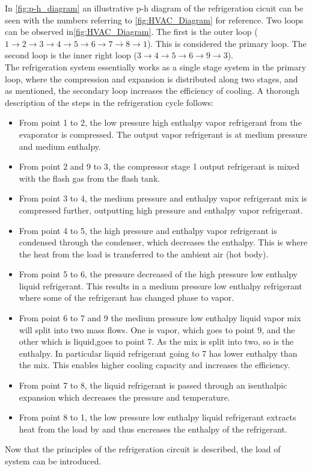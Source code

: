 In \cref{fig:p-h_diagram} an illustrative p-h diagram of the refrigeration cicuit can be seen with the numbers referring to \cref{fig:HVAC_Diagram} for reference. Two loops can be observed in\cref{fig:HVAC_Diagram}. The first is the outer loop ($1 \rightarrow 2\rightarrow 3 \rightarrow 4 \rightarrow 5 \rightarrow 6 \rightarrow 7 \rightarrow 8 \rightarrow 1$). This is considered the primary loop. The second loop is the inner right loop ($3 \rightarrow 4 \rightarrow 5 \rightarrow 6 \rightarrow 9 \rightarrow 3$). \\
The refrigeration system essentially works as a single stage system in the primary loop, where the compression and expansion is distributed along two stages, and as mentioned, the secondary loop  increases the efficiency of cooling. A thorough description of the steps in the refrigeration cycle follows:
\begin{itemize}
	\item From point 1 to 2, the low pressure high enthalpy vapor refrigerant from the evaporator is compressed. The output vapor refrigerant is at medium pressure and medium enthalpy. 
	\item From point 2 and 9 to 3, the compressor stage 1 output refrigerant is mixed with the flash gas from the flash tank. 
	\item From point 3 to 4, the medium pressure and enthalpy vapor refrigerant mix is compressed further, outputting high pressure and enthalpy vapor refrigerant.
	\item From point 4 to 5, the high pressure and enthalpy vapor refrigerant is condensed through the condenser, which decreases the enthalpy. This is where the heat from the load is transferred to the ambient air (hot body).
	\item From point 5 to 6, the pressure decreased of the high pressure low enthalpy liquid refrigerant. This results in a medium pressure low enthalpy refrigerant where some of the refrigerant has changed phase to vapor.
	\item From point 6 to 7 and 9 the medium pressure low enthalpy liquid vapor mix will split into two mass flows. One is vapor, which goes to point 9, and the other which is liquid,goes to point 7. As the mix is split into two, so is the enthalpy. In particular liquid refrigerant going to 7 has lower enthalpy than the mix. This enables higher cooling capacity and increases the efficiency.
	\item From point 7 to 8, the liquid refrigerant is passed through an isenthalpic expansion which decreases the pressure and temperature.
	\item From point 8 to 1, the low pressure low enthalpy liquid refrigerant extracts heat from the load by and thus encreases the enthalpy of the refrigerant.
\end{itemize}
Now that the principles of the refrigeration circuit is described, the load of system can be introduced. \\


